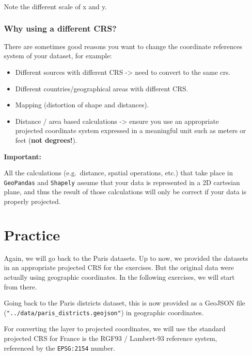 \documentclass[
  letterpaper,
  DIV=11,
  numbers=noendperiod]{scrreprt}
\providecommand{\tightlist}{%
  \setlength{\itemsep}{0pt}\setlength{\parskip}{0pt}}\usepackage{longtable,booktabs,array}
\begin{document}
Note the different scale of x and y.

\subsubsection{Why using a different
CRS?}\label{why-using-a-different-crs}

There are sometimes good reasons you want to change the coordinate
references system of your dataset, for example:

\begin{itemize}
\tightlist
\item
  Different sources with different CRS -\textgreater{} need to convert
  to the same crs.\\
\item
  Different countries/geographical areas with different CRS.
\item
  Mapping (distortion of shape and distances).
\item
  Distance / area based calculations -\textgreater{} ensure you use an
  appropriate projected coordinate system expressed in a meaningful unit
  such as meters or feet (\textbf{not degrees!}).
\end{itemize}

\textbf{Important:}

All the calculations (e.g.~distance, spatial operations, etc.) that take
place in \texttt{GeoPandas} and \texttt{Shapely} assume that your data
is represented in a 2D cartesian plane, and thus the result of those
calculations will only be correct if your data is properly projected.

\section{Practice}\label{practice-1}

Again, we will go back to the Paris datasets. Up to now, we provided the
datasets in an appropriate projected CRS for the exercises. But the
original data were actually using geographic coordinates. In the
following exercises, we will start from there.

Going back to the Paris districts dataset, this is now provided as a
GeoJSON file (\texttt{"../data/paris\_districts.geojson"}) in geographic
coordinates.

For converting the layer to projected coordinates, we will use the
standard projected CRS for France is the RGF93 / Lambert-93 reference
system, referenced by the \texttt{EPSG:2154} number.
\end{document}
